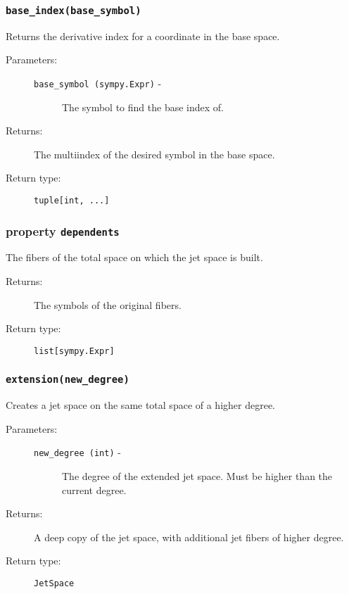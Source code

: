    \subsubsection*{\lstinline{base_index(base_symbol)}}

      Returns the derivative index for a coordinate in the base space.

      \begin{description}
         \item[Parameters:] \leavevmode
           \begin{description}
               \item[\lstinline{base_symbol (sympy.Expr)} -] The symbol to find the base index of.
           \end{description}
         \item[Returns:] The multiindex of the desired symbol in the base space.
         \item[Return type:] \lstinline{tuple[int, ...]} 
      \end{description}

   \subsubsection*{property \lstinline{dependents}}

      The fibers of the total space on which the jet space is built.

      \begin{description}
         \item[Returns:] The symbols of the original fibers.
         \item[Return type:] \lstinline{list[sympy.Expr]}
      \end{description}
   
   \subsubsection*{\lstinline{extension(new_degree)}}

      Creates a jet space on the same total space of a higher degree.

      \begin{description}
         \item[Parameters:] \leavevmode
           \begin{description}
               \item[\lstinline{new_degree (int)} -] The degree of the extended jet space. Must be higher than the current degree.
           \end{description}
         \item[Returns:] A deep copy of the jet space, with additional jet fibers of higher degree.
         \item[Return type:] \lstinline{JetSpace}
      \end{description}

